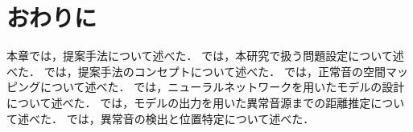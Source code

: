 \documentclass[../main]{subfiles}
\begin{document}
\section{おわりに}
\label{sec:pmethod_conclusion}

本章では，提案手法について述べた．
では，本研究で扱う問題設定について述べた．
では，提案手法のコンセプトについて述べた．
では，正常音の空間マッピングについて述べた．
では，ニューラルネットワークを用いたモデルの設計について述べた．
では，モデルの出力を用いた異常音源までの距離推定について述べた．
では，異常音の検出と位置特定について述べた．
\end{document}
